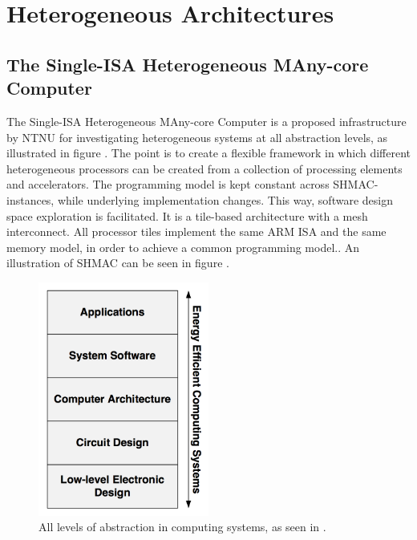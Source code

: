 
\section{Heterogeneous Architectures}
\label{sec:heterogeneous}


\subsection{The Single-ISA Heterogeneous MAny-core Computer}
\label{sec:shmac}
The Single-ISA Heterogeneous MAny-core Computer is a proposed infrastructure by NTNU for investigating heterogeneous systems at all abstraction levels, as illustrated in figure \cite{fig:shmacAbstractionLevels}.
The point is to create a flexible framework in which different heterogeneous processors can be created from a collection of processing elements and accelerators.
The programming model is kept constant across SHMAC-instances, while underlying implementation changes.
This way, software design space exploration is facilitated.
It is a tile-based architecture with a mesh interconnect.
All processor tiles implement the same ARM ISA and the same memory model, in order to achieve a common programming model.\cite{shmac-plan}.
An illustration of SHMAC can be seen in figure \cite{fig:shmac}.

\begin{figure}[htb]
    \centering
    \includegraphics[width=0.5\textwidth]{Figures/Heterogeneous/SHMACAbstractionLevels}
    \caption{All levels of abstraction in computing systems, as seen in \cite{shmac-plan}.}
    \label{fig:shmacAbstracionLevels}
\end{figure}

